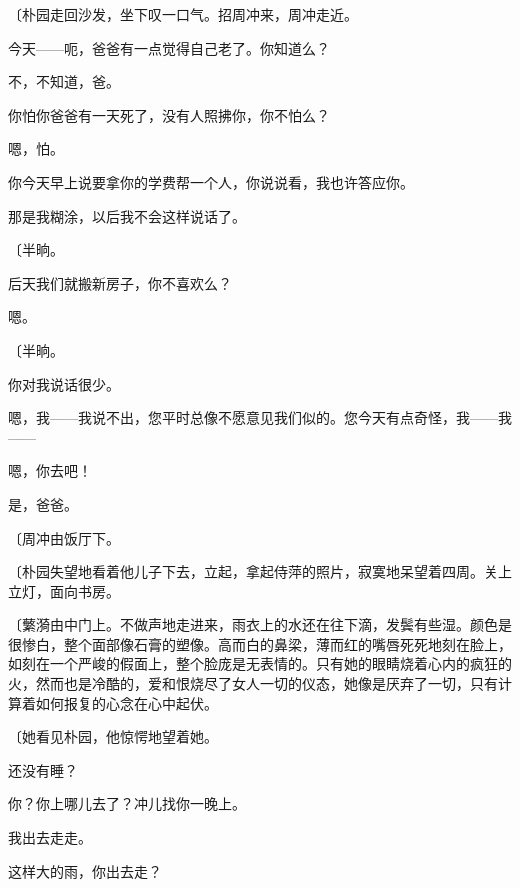 {\fangsong〔朴园走回沙发，坐下叹一口气。招周冲来，周冲走近。}

今天——呃，爸爸有一点觉得自己老了。你知道么？

不，不知道，爸。

你怕你爸爸有一天死了，没有人照拂你，你不怕么？

嗯，怕。

你今天早上说要拿你的学费帮一个人，你说说看，我也许答应你。

那是我糊涂，以后我不会这样说话了。

{\fangsong〔半晌。}

后天我们就搬新房子，你不喜欢么？

嗯。

{\fangsong〔半晌。}

你对我说话很少。

嗯，我——我说不出，您平时总像不愿意见我们似的。您今天有点奇怪，我——我——

嗯，你去吧！

是，爸爸。

{\fangsong〔周冲由饭厅下。}

{\fangsong〔朴园失望地看着他儿子下去，立起，拿起侍萍的照片，寂寞地呆望着四周。关上立灯，面向书房。}

{\fangsong〔蘩漪由中门上。不做声地走进来，雨衣上的水还在往下滴，发鬓有些湿。颜色是很惨白，整个面部像石膏的塑像。高而白的鼻梁，薄而红的嘴唇死死地刻在脸上，如刻在一个严峻的假面上，整个脸庞是无表情的。只有她的眼睛烧着心内的疯狂的火，然而也是冷酷的，爱和恨烧尽了女人一切的仪态，她像是厌弃了一切，只有计算着如何报复的心念在心中起伏。}

{\fangsong〔她看见朴园，他惊愕地望着她。}

还没有睡？

你？你上哪儿去了？冲儿找你一晚上。

我出去走走。

这样大的雨，你出去走？

